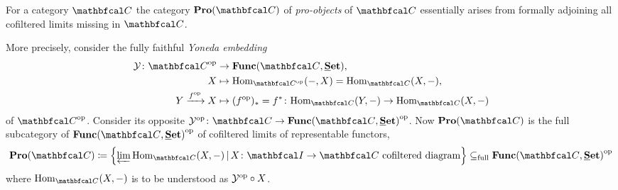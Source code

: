 \begin{construction}
	\label{Construction: Pro-categories}
	
	For a category $\category C$ the category $\ProCategory {\category C}$ of \emph{pro-objects} of $\category C$ essentially arises from formally adjoining all cofiltered limits missing in $\category C$.
	
	More precisely, consider the fully faithful \emph{Yoneda embedding}
	\begin{align*}
		\yoneda\colon \category C^\op &\to \functorCategory {\category C} {\Set},\\
		X&\mapsto \Hom_{\category C^\op}(-, X) = \Hom_\category C(X, -),\\
		Y\xrightarrow{f^\op} X &\mapsto (f^\op)_\ast = f^\ast \colon \Hom_\category C(Y, -)\to \Hom_\category C(X, -)
	\end{align*}
	of $\category C^\op$. Consider its opposite $\yoneda^\op\colon \category C \to \functorCategory{\category C}{\Set}^\op$. Now $\ProCategory{\category C}$ is the full subcategory of $\functorCategory{\category C}{\Set}^\op$ of cofiltered limits of representable functors, \ie
		$$\ProCategory{\category C} \ldef \left\{\limit \Hom_\category C(X, -)\setseparator X\colon \category I\to\category C\text{ cofiltered diagram}\right\}\subseteq_\text{full} \functorCategory{\category C}{\Set}^\op$$
	where $\Hom_\category C(X, -)$ is to be understood as ${\mathcal Y}^{\mathrm{op}} \circ X$.
\end{construction}


